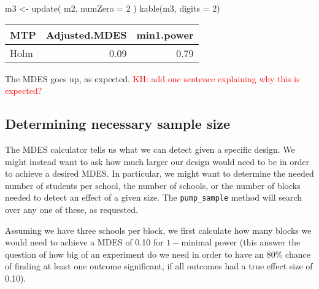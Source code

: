\documentclass[
]{article}
\newenvironment{Shaded}{\begin{snugshade}}{\end{snugshade}}
\newcommand{\AttributeTok}[1]{\textcolor[rgb]{0.77,0.63,0.00}{#1}}
\newcommand{\DecValTok}[1]{\textcolor[rgb]{0.00,0.00,0.81}{#1}}
\newcommand{\FunctionTok}[1]{\textcolor[rgb]{0.00,0.00,0.00}{#1}}
\newcommand{\NormalTok}[1]{#1}
\newcommand{\OtherTok}[1]{\textcolor[rgb]{0.56,0.35,0.01}{#1}}
\begin{document}
\begin{Shaded}
\begin{Highlighting}[]
\NormalTok{m3 }\OtherTok{\textless{}{-}} \FunctionTok{update}\NormalTok{( m2, }\AttributeTok{numZero =} \DecValTok{2}\NormalTok{ )}
\FunctionTok{kable}\NormalTok{(m3, }\AttributeTok{digits =} \DecValTok{2}\NormalTok{)}
\end{Highlighting}
\end{Shaded}

\begin{tabular}{l|r|r}
\hline
MTP & Adjusted.MDES & min1.power\\
\hline
Holm & 0.09 & 0.79\\
\hline
\end{tabular}

The MDES goes up, as expected.
\textcolor{red}{KH: add one sentence explaining why this is expected?}

\subsection{Determining necessary sample size}

The MDES calculator tells us what we can detect given a specific design.
We might instead want to ask how much larger our design would need to be
in order to achieve a desired MDES. In particular, we might want to
determine the needed number of students per school, the number of
schools, or the number of blocks needed to detect an effect of a given
size. The \texttt{pump\_sample} method will search over any one of
these, as requested.

Assuming we have three schools per block, we first calculate how many
blocks we would need to achieve a MDES of 0.10 for \(1-\)minimal power
(this answer the question of how big of an experiment do we need in
order to have an 80\% chance of finding at least one outcome
significant, if all outcomes had a true effect size of 0.10).
\end{document}
